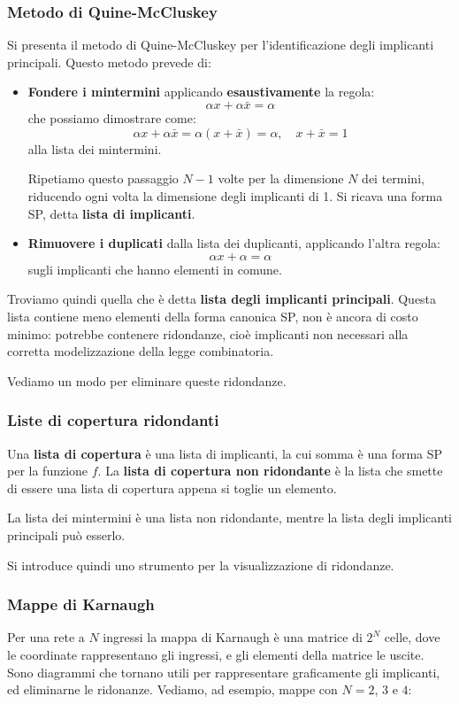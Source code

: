 \documentclass[a4paper,11pt]{article}
\begin{document}
\subsubsection{Metodo di Quine-McCluskey}
Si presenta il metodo di Quine-McCluskey per l'identificazione degli implicanti principali.
Questo metodo prevede di:
\begin{itemize}
	\item \textbf{Fondere i mintermini} applicando \textbf{esaustivamente} la regola:
$$
\alpha x + \alpha \bar{x} = \alpha
$$
che possiamo dimostrare come:
$$
\alpha x + \alpha \bar{x} = \alpha (x + \bar{x}) = \alpha, \quad x + \bar{x} = 1
$$
alla lista dei mintermini.

Ripetiamo questo passaggio $N - 1$ volte per la dimensione $N$ dei termini, riducendo ogni volta la dimensione degli implicanti di 1.
Si ricava una forma SP, detta \textbf{lista di implicanti}.
	\item \textbf{Rimuovere i duplicati} dalla lista dei duplicanti, applicando l'altra regola:
$$
\alpha x + \alpha = \alpha 
$$
sugli implicanti che hanno elementi in comune.
\end{itemize}

Troviamo quindi quella che è detta \textbf{lista degli implicanti principali}.
Questa lista contiene meno elementi della forma canonica SP, non è ancora di costo minimo: potrebbe contenere ridondanze, cioè implicanti non necessari alla corretta modelizzazione della legge combinatoria.

Vediamo un modo per eliminare queste ridondanze.

\subsubsection{Liste di copertura ridondanti}
Una \textbf{lista di copertura} è una lista di implicanti, la cui somma è una forma SP per la funzione $f$.
La \textbf{lista di copertura non ridondante} è la lista che smette di essere una lista di copertura appena si toglie un elemento.

La lista dei mintermini è una lista non ridondante, mentre la lista degli implicanti principali può esserlo.

Si introduce quindi uno strumento per la visualizzazione di ridondanze.

\subsubsection{Mappe di Karnaugh}
Per una rete a $N$ ingressi la mappa di Karnaugh è una matrice di $2^N$ celle, dove le coordinate rappresentano gli ingressi, e gli elementi della matrice le uscite.
Sono diagrammi che tornano utili per rappresentare graficamente gli implicanti, ed eliminarne le ridonanze.
Vediamo, ad esempio, mappe con $N = 2$, $3$ e $4$:
\end{document}

